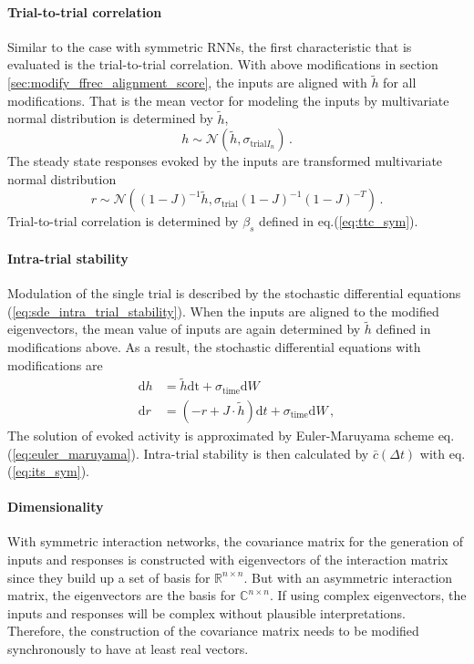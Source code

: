 \documentclass[11pt]{article}
\begin{document}
{	\paragraph{Trial-to-trial correlation} 
	Similar to the case with symmetric RNNs, the first characteristic that is evaluated is the trial-to-trial correlation. With above modifications in section \ref{sec:modify_ffrec_alignment_score}, the inputs are aligned with $\tilde{h}$ for all modifications. That is the mean vector for modeling the inputs by multivariate normal distribution is determined by $\tilde{h}$, 
		\begin{equation}
				h \sim \mathcal{N}(\tilde{h}, \sigma_{\text{trial}I_n}) \, .
		\end{equation}
		The steady state responses evoked by the inputs are transformed multivariate normal distribution
		\begin{equation}
				r \sim \mathcal{N}\left((1-J)^{-1}\tilde{h}, \sigma_{\text{trial}} (1-J)^{-1} (1-J)^{-T}\right) \, .
		\end{equation}
	Trial-to-trial correlation is determined by $\beta_s$ defined in eq.(\ref{eq:ttc_sym}). 
	
	\paragraph{Intra-trial stability} Modulation of the single trial is described by the stochastic differential equations (\ref{eq:sde_intra_trial_stability}). When the inputs are aligned to the modified eigenvectors, the mean value of inputs are again determined by $\tilde{h}$ defined in modifications above. As a result, the stochastic differential equations with modifications are 
		\begin{subequations}
			\begin{align}
				\mathrm{d} h & = \tilde{h} \mathrm{dt} + \sigma_{\text{time}} \mathrm{d} W \\
				\mathrm{d} r & = (-r + J \cdot \tilde{h}) \mathrm{d}t + \sigma_{\text{time}} \mathrm{d} W \, ,
			\end{align}
		\end{subequations}
	The solution of evoked activity is approximated by Euler-Maruyama scheme eq.(\ref{eq:euler_maruyama}). Intra-trial stability is then calculated by $\bar{c}(\Delta t)$ with eq.(\ref{eq:its_sym}). 
	
	\paragraph{Dimensionality}%
	With symmetric interaction networks, the covariance matrix for the generation of inputs and responses is constructed with eigenvectors of the interaction matrix since they build up a set of basis for $\mathbb{R}^{n \times n}$. But with an asymmetric interaction matrix, the eigenvectors are the basis for $\mathbb{C}^{n \times n}$. If using complex eigenvectors, the inputs and responses will be complex without plausible interpretations. Therefore, the construction of the covariance matrix needs to be modified synchronously to have at least real vectors. 
				  
}
\end{document}
